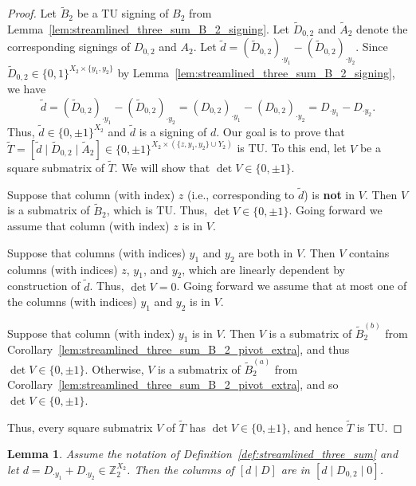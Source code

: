 \documentclass{article}
\newtheorem{lemma}{Lemma}
\theoremstyle{definition}
\begin{document}
\begin{proof}
    Let $\tilde{B}_{2}$ be a TU signing of $B_{2}$ from Lemma~\ref{lem:streamlined_three_sum_B_2_signing}. Let $\tilde{D}_{0, 2}$ and $\tilde{A}_{2}$ denote the corresponding signings of $D_{0, 2}$ and $A_{2}$. Let $\tilde{d} = (\tilde{D}_{0, 2})_{\cdot y_{1}} - (\tilde{D}_{0, 2})_{\cdot y_{2}}$. Since $\tilde{D}_{0, 2} \in \{0, 1\}^{X_{2} \times \{y_{1}, y_{2}\}}$ by Lemma~\ref{lem:streamlined_three_sum_B_2_signing}, we have
    \[
        \tilde{d} = (\tilde{D}_{0, 2})_{\cdot y_{1}} - (\tilde{D}_{0, 2})_{\cdot y_{2}} = (D_{0, 2})_{\cdot y_{1}} - (D_{0, 2})_{\cdot y_{2}} = D_{\cdot y_{1}} - D_{\cdot y_{2}}.
    \]
    Thus, $\tilde{d} \in \{0, \pm 1\}^{X_{2}}$ and $\tilde{d}$ is a signing of $d$. Our goal is to prove that $\tilde{T} = [\tilde{d} \mid \tilde{D}_{0, 2} \mid \tilde{A}_{2}] \in \{0, \pm 1\}^{X_{2} \times (\{z, y_{1}, y_{2}\} \cup Y_{2})}$ is TU. To this end, let $V$ be a square submatrix of $\tilde{T}$. We will show that $\det V \in \{0, \pm 1\}$.

    Suppose that column (with index) $z$ (i.e., corresponding to $\tilde{d}$) is \textbf{not} in $V$. Then $V$ is a submatrix of $\tilde{B}_{2}$, which is TU. Thus, $\det V \in \{0, \pm 1\}$. Going forward we assume that column (with index) $z$ is in $V$.

    Suppose that columns (with indices) $y_{1}$ and $y_{2}$ are both in $V$. Then $V$ contains columns (with indices) $z$, $y_{1}$, and $y_{2}$, which are linearly dependent by construction of $\tilde{d}$. Thus, $\det V = 0$. Going forward we assume that at most one of the columns (with indices) $y_{1}$ and $y_{2}$ is in $V$.

    Suppose that column (with index) $y_{1}$ is in $V$. Then $V$ is a submatrix of $\tilde{B}_{2}^{(b)}$ from Corollary~\ref{lem:streamlined_three_sum_B_2_pivot_extra}, and thus $\det V \in \{0, \pm 1\}$. Otherwise, $V$ is a submatrix of $\tilde{B}_{2}^{(a)}$ from Corollary~\ref{lem:streamlined_three_sum_B_2_pivot_extra}, and so $\det V \in \{0, \pm 1\}$.

    Thus, every square submatrix $V$ of $\tilde{T}$ has $\det V \in \{0, \pm 1\}$, and hence $\tilde{T}$ is TU.
\end{proof}

\begin{lemma}\label{lem:three_sum_columns_of_d_D}
    Assume the notation of Definition~\ref{def:streamlined_three_sum} and let $d = D_{\cdot y_{1}} + D_{\cdot y_{2}} \in \mathbb{Z}_{2}^{X_{2}}$. Then the columns of $[d \mid D]$ are in $[d \mid D_{0, 2} \mid 0]$.
\end{lemma}
\end{document}
